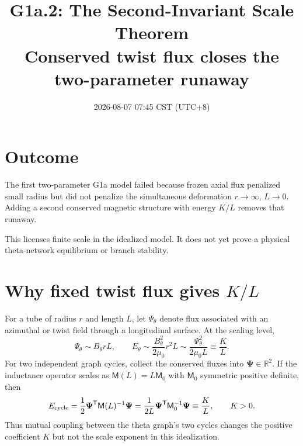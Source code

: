 \documentclass[11pt]{article}
\title{G1a.2: The Second-Invariant Scale Theorem\\
\large Conserved twist flux closes the two-parameter runaway}
\author{}
\date{2026-08-07 07:45 CST (UTC+8)}
\begin{document}
\maketitle

\section{Outcome}

The first two-parameter G1a model failed because frozen axial flux penalized small
radius but did not penalize the simultaneous deformation $r\to\infty$, $L\to0$.
Adding a second conserved magnetic structure with energy $K/L$ removes that runaway.

\begin{center}
\end{center}

This licenses finite scale in the idealized model. It does not yet prove a physical
theta-network equilibrium or branch stability.

\section{Why fixed twist flux gives \texorpdfstring{$K/L$}{K/L}}

For a tube of radius $r$ and length $L$, let $\Psi_\theta$ denote flux associated
with an azimuthal or twist field through a longitudinal surface. At the scaling
level,
\[
\Psi_\theta\sim B_\theta rL,
\qquad
E_\theta\sim\frac{B_\theta^2}{2\mu_0}r^2L
\sim\frac{\Psi_\theta^2}{2\mu_0L}
\equiv\frac{K}{L}.
\]
For two independent graph cycles, collect the conserved fluxes into
$\boldsymbol\Psi\in\mathbb R^2$. If the inductance operator scales as
$\mathsf M(L)=L\mathsf M_0$ with $\mathsf M_0$ symmetric positive definite, then
\[
E_{\rm cycle}
=\frac12\boldsymbol\Psi^{\mathsf T}\mathsf M(L)^{-1}\boldsymbol\Psi
=\frac{1}{2L}
\boldsymbol\Psi^{\mathsf T}\mathsf M_0^{-1}\boldsymbol\Psi
\equiv\frac{K}{L},
\qquad K>0.
\]
Thus mutual coupling between the theta graph's two cycles changes the positive
coefficient $K$ but not the scale exponent in this idealization.
\end{document}
